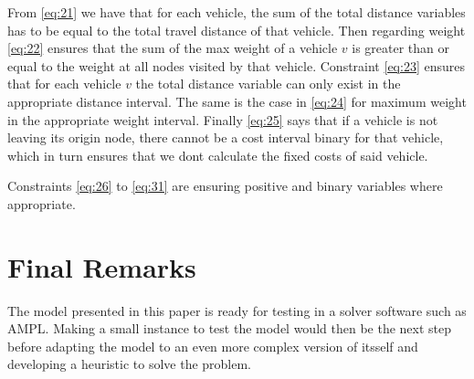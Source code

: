 \documentclass[a4paper,10pt]{article}
\begin{document}
From \ref{eq:21} we have that for each vehicle, the sum of the total distance variables has to be equal to the total travel distance of that vehicle.
Then regarding weight \ref{eq:22} ensures that the sum of the max weight of a vehicle $v$ is greater than or equal to the weight at all nodes visited by that vehicle.
Constraint \ref{eq:23} ensures that for each vehicle $v$ the total distance variable can only exist in the appropriate distance interval.
The same is the case in \ref{eq:24} for maximum weight in the appropriate weight interval.
Finally \ref{eq:25} says that if a vehicle is not leaving its origin node, there cannot be a cost interval binary for that vehicle, which in turn ensures that we dont calculate the fixed costs of said vehicle. \par
Constraints \ref{eq:26} to \ref{eq:31} are ensuring positive and binary variables where appropriate.  \par

\section{Final Remarks}
The model presented in this paper is ready for testing in a solver software such as AMPL. Making a small instance to test the model would then be the next step before adapting the model to an even more complex version of itsself and developing a heuristic to solve the problem. 




\end{document}
